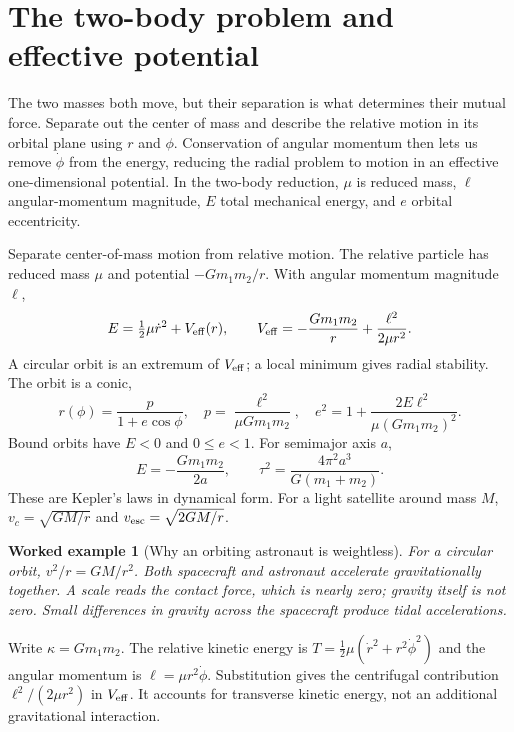 \documentclass[11pt,oneside]{book}
\theoremstyle{reviewstyle}
\newtheorem{example}{Worked example}[chapter]
\begin{document}
\section{The two-body problem and effective potential}
The two masses both move, but their separation is what determines their mutual force. Separate out the center of mass and describe the relative motion in its orbital plane using $r$ and $\phi$. Conservation of angular momentum then lets us remove $\dot\phi$ from the energy, reducing the radial problem to motion in an effective one-dimensional potential. In the two-body reduction, $\mu$ is reduced mass, $\ell$ angular-momentum magnitude, $E$ total mechanical energy, and $e$ orbital eccentricity.

Separate center-of-mass motion from relative motion. The relative particle has reduced mass $\mu$ and potential $-Gm_1m_2/r$. With angular momentum magnitude $\ell$,
\begin{equation}
E=\tfrac12\mu\dot r^2+V_{\rm eff}(r),\qquad
V_{\rm eff}=-\frac{Gm_1m_2}{r}+\frac{\ell^2}{2\mu r^2}.
\end{equation}
A circular orbit is an extremum of $V_{\rm eff}$; a local minimum gives radial stability. The orbit is a conic,
\begin{equation}
r(\phi)=\frac{p}{1+e\cos\phi},\quad
p=\frac{\ell^2}{\mu Gm_1m_2},\quad
e^2=1+\frac{2E\ell^2}{\mu(Gm_1m_2)^2}.
\end{equation}
Bound orbits have $E<0$ and $0\leq e<1$. For semimajor axis $a$,
\begin{equation}
E=-\frac{Gm_1m_2}{2a},\qquad
\tau^2=\frac{4\pi^2a^3}{G(m_1+m_2)}.
\end{equation}
These are Kepler's laws in dynamical form. For a light satellite around mass $M$,
$v_c=\sqrt{GM/r}$ and $v_{\rm esc}=\sqrt{2GM/r}$.
\begin{example}[Why an orbiting astronaut is weightless]
For a circular orbit, $v^2/r=GM/r^2$. Both spacecraft and astronaut accelerate gravitationally together. A scale reads the contact force, which is nearly zero; gravity itself is not zero. Small differences in gravity across the spacecraft produce tidal accelerations.
\end{example}

Write $\kappa=Gm_1m_2$. The relative kinetic energy is $T=\tfrac12\mu(\dot r^2+r^2\dot\phi^2)$ and the angular momentum is $\ell=\mu r^2\dot\phi$. Substitution gives the centrifugal contribution $\ell^2/(2\mu r^2)$ in $V_{\rm eff}$. It accounts for transverse kinetic energy, not an additional gravitational interaction.
\end{document}
